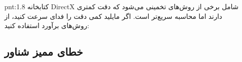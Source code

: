 {\begin{spacing}{1.5}
        \begin{point}{pnt:1.8}
            \Large
            کتابخانه DirectX شامل برخی از روش‌های تخمینی می‌شود که دقت کمتری دارند اما محاسبه سریع‌تر است.
            اگر مایلید کمی دقت را فدای سرعت کنید، از روش‌های برآورد استفاده کنید:
            \textbf{\vspace{6pt}}
            \lr{}
            \textbf{\vspace{-40pt}}
        \end{point}
    \end{spacing}
}

\subsection{\textbf{خطای ممیز شناور}}
